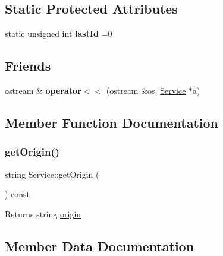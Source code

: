 \subsection*{Static Protected Attributes}
\begin{DoxyCompactItemize}
\item 
\mbox{\label{class_service_aa80a6461b0877972c7bbd427cff39175}} 
static unsigned int {\bfseries last\+Id} =0
\end{DoxyCompactItemize}
\subsection*{Friends}
\begin{DoxyCompactItemize}
\item 
\mbox{\label{class_service_a641fd7efe1dd35ea19ac062c4e2ece45}} 
ostream \& {\bfseries operator$<$$<$} (ostream \&os, \hyperlink{class_service}{Service} $\ast$a)
\end{DoxyCompactItemize}


\subsection{Member Function Documentation}
\mbox{\label{class_service_a2142a2fd589d94614694a71d9e7c2647}} 
\subsubsection{\texorpdfstring{get\+Origin()}{getOrigin()}}
{\footnotesize\ttfamily string Service\+::get\+Origin (\begin{DoxyParamCaption}{ }\end{DoxyParamCaption}) const}

\begin{DoxyReturn}{Returns}
string \hyperlink{class_service_a0e23ac4930720ab597a5c584703151f9}{origin} 
\end{DoxyReturn}


\subsection{Member Data Documentation}
\mbox{\label{class_service_a0e23ac4930720ab597a5c584703151f9}} 
